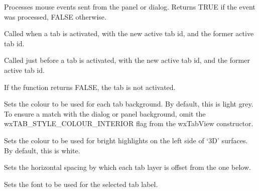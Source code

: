 
Processes mouse events sent from the panel or dialog. Returns TRUE if the event was processed,
FALSE otherwise.



Called when a tab is activated, with the new active tab id, and the former active tab id.



Called just before a tab is activated, with the new active tab id, and the former active tab id.

If the function returns FALSE, the tab is not activated.



Sets the colour to be used for each tab background. By default, this is
light grey. To ensure a match with the dialog or panel background, omit
the wxTAB\_STYLE\_COLOUR\_INTERIOR flag from the wxTabView constructor. 



Sets the colour to be used for bright highlights on the left side of `3D' surfaces. By default, this is white.



Sets the horizontal spacing by which each tab layer is offset from the one below.



Sets the font to be used for the selected tab label.



